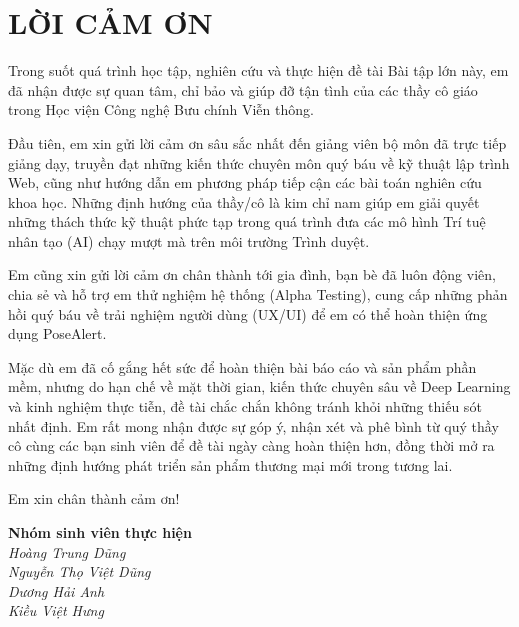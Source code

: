 \documentclass[12pt,a4paper]{report}
\begin{document}
\newpage
\chapter*{LỜI CẢM ƠN}
Trong suốt quá trình học tập, nghiên cứu và thực hiện đề tài Bài tập lớn này, em đã nhận được sự quan tâm, chỉ bảo và giúp đỡ tận tình của các thầy cô giáo trong Học viện Công nghệ Bưu chính Viễn thông. 

Đầu tiên, em xin gửi lời cảm ơn sâu sắc nhất đến giảng viên bộ môn đã trực tiếp giảng dạy, truyền đạt những kiến thức chuyên môn quý báu về kỹ thuật lập trình Web, cũng như hướng dẫn em phương pháp tiếp cận các bài toán nghiên cứu khoa học. Những định hướng của thầy/cô là kim chỉ nam giúp em giải quyết những thách thức kỹ thuật phức tạp trong quá trình đưa các mô hình Trí tuệ nhân tạo (AI) chạy mượt mà trên môi trường Trình duyệt.

Em cũng xin gửi lời cảm ơn chân thành tới gia đình, bạn bè đã luôn động viên, chia sẻ và hỗ trợ em thử nghiệm hệ thống (Alpha Testing), cung cấp những phản hồi quý báu về trải nghiệm người dùng (UX/UI) để em có thể hoàn thiện ứng dụng PoseAlert.

Mặc dù em đã cố gắng hết sức để hoàn thiện bài báo cáo và sản phẩm phần mềm, nhưng do hạn chế về mặt thời gian, kiến thức chuyên sâu về Deep Learning và kinh nghiệm thực tiễn, đề tài chắc chắn không tránh khỏi những thiếu sót nhất định. Em rất mong nhận được sự góp ý, nhận xét và phê bình từ quý thầy cô cùng các bạn sinh viên để đề tài ngày càng hoàn thiện hơn, đồng thời mở ra những định hướng phát triển sản phẩm thương mại mới trong tương lai.

Em xin chân thành cảm ơn!

\vspace{2cm}
\begin{flushright}
    \textbf{Nhóm sinh viên thực hiện} \\
    \vspace{1.5cm}
    \textit{Hoàng Trung Dũng}\\
    \textit{Nguyễn Thọ Việt Dũng}\\
    \textit{Dương Hải Anh}\\
    \textit{Kiều Việt Hưng}\\
\end{flushright}

\newpage
\tableofcontents
\end{document}
